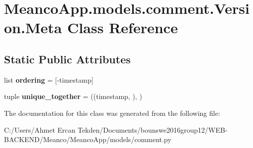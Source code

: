 \hypertarget{class_meanco_app_1_1models_1_1comment_1_1_version_1_1_meta}{}\section{Meanco\+App.\+models.\+comment.\+Version.\+Meta Class Reference}
\label{class_meanco_app_1_1models_1_1comment_1_1_version_1_1_meta}
\subsection*{Static Public Attributes}
\begin{DoxyCompactItemize}
\item 
\hypertarget{class_meanco_app_1_1models_1_1comment_1_1_version_1_1_meta_add2c3c2e3ee5276611a00e73627c239e}{}\label{class_meanco_app_1_1models_1_1comment_1_1_version_1_1_meta_add2c3c2e3ee5276611a00e73627c239e} 
list {\bfseries ordering} = \mbox{[}\textquotesingle{}-\/timestamp\textquotesingle{}\mbox{]}
\item 
\hypertarget{class_meanco_app_1_1models_1_1comment_1_1_version_1_1_meta_ad8e0d67aa24b7727962131a204c497fd}{}\label{class_meanco_app_1_1models_1_1comment_1_1_version_1_1_meta_ad8e0d67aa24b7727962131a204c497fd} 
tuple {\bfseries unique\+\_\+together} = ((\textquotesingle{}timestamp\textquotesingle{}, ), )
\end{DoxyCompactItemize}


The documentation for this class was generated from the following file\+:\begin{DoxyCompactItemize}
\item 
C\+:/\+Users/\+Ahmet Ercan Tekden/\+Documents/bounswe2016group12/\+W\+E\+B-\/\+B\+A\+C\+K\+E\+N\+D/\+Meanco/\+Meanco\+App/models/comment.\+py\end{DoxyCompactItemize}
